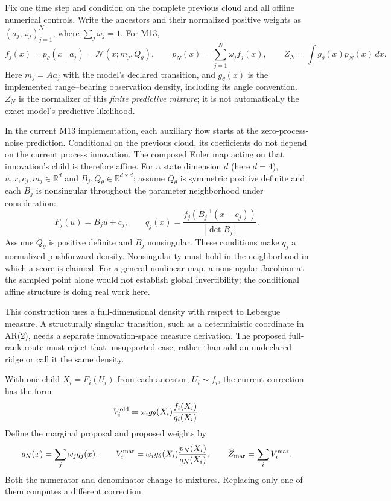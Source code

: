 \documentclass[11pt]{article}
\newcommand{\N}{\mathcal N}
\begin{document}
Fix one time step and condition on the complete previous cloud and all
offline numerical controls. Write the ancestors and their normalized
positive weights as $(a_j,\omega_j)_{j=1}^N$, where
$\sum_j\omega_j=1$. For M13,
\begin{equation}
 f_j(x)=p_\theta(x\mid a_j)=\N(x;m_j,Q_\theta),\qquad
 p_N(x)=\sum_{j=1}^N\omega_j f_j(x),\qquad
 Z_N=\int g_\theta(x)p_N(x)\,dx .
 \label{eq:predictive-mixture}
\end{equation}
Here $m_j=Aa_j$ with the model's declared transition, and $g_\theta(x)$ is
the implemented range--bearing observation density, including its angle
convention. $Z_N$ is the normalizer of this \emph{finite predictive
mixture}; it is not automatically the exact model's predictive likelihood.

In the current M13 implementation, each auxiliary flow starts at the
zero-process-noise prediction. Conditional on the previous cloud, its
coefficients do not depend on the current process innovation. The composed
Euler map acting on that innovation's child is therefore affine. For a
state dimension $d$ (here $d=4$), $u,x,c_j,m_j\in\mathbb R^d$ and
$B_j,Q_\theta\in\mathbb R^{d\times d}$; assume $Q_\theta$ is symmetric
positive definite and each $B_j$ is nonsingular throughout the
parameter neighborhood under consideration:
\begin{equation}
 F_j(u)=B_j u+c_j,\qquad
 q_j(x)=\frac{f_j\!\left(B_j^{-1}(x-c_j)\right)}
                   {|\det B_j|}.
 \label{eq:affine-density}
\end{equation}
Assume $Q_\theta$ is positive definite and $B_j$ nonsingular.
These conditions make $q_j$ a normalized pushforward density.
Nonsingularity must hold in the neighborhood in which a score is claimed.
For a general nonlinear map, a nonsingular Jacobian at the sampled point
alone would not establish global invertibility; the conditional affine
structure is doing real work here.

This construction uses a full-dimensional density with respect to Lebesgue
measure. A structurally singular transition, such as a deterministic
coordinate in AR(2), needs a separate innovation-space measure derivation.
The proposed full-rank route must reject that unsupported case, rather
than add an undeclared ridge or call it the same density.

With one child $X_i=F_i(U_i)$ from each ancestor, $U_i\sim f_i$, the current
correction has the form
\begin{equation}
 V_i^{\rm old}=\omega_i g_\theta(X_i)
                         \frac{f_i(X_i)}{q_i(X_i)} .
 \label{eq:old-weight}
\end{equation}
Define the marginal proposal and proposed weights by
\begin{equation}
 q_N(x)=\sum_j\omega_j q_j(x),\qquad
 V_i^{\rm mar}=\omega_i g_\theta(X_i)
                       \frac{p_N(X_i)}{q_N(X_i)},\qquad
 \widehat Z_{\rm mar}=\sum_i V_i^{\rm mar}.
 \label{eq:marginal-weight}
\end{equation}
Both the numerator and denominator change to mixtures. Replacing only one
of them computes a different correction.
\end{document}
